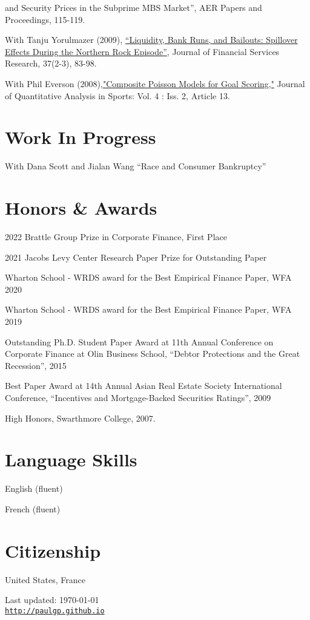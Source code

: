 \documentclass[letterpaper]{article}
\renewenvironment{itemize}{
  \begin{list}{}
    { \setlength{\itemsep}{5pt}
      \setlength{\parsep}{0pt}
      \setlength{\topsep}{0pt}
      \setlength{\leftmargin}{0em} } }{
  \end{list}}
\begin{document}
\begin{itemize}
{    and Security Prices in the Subprime MBS Market''}, AER Papers and Proceedings,  115-119. 
\item With Tanju Yorulmazer (2009), \href{http://www.springerlink.com/content/ww187761jgr660q5/}{``Liquidity, Bank Runs, and Bailouts: Spillover Effects During the Northern Rock Episode''}, Journal of Financial Services Research, 37(2-3), 83-98. 
\item With Phil Everson (2008),\href{http://www.bepress.com/jqas/vol4/iss2/13/}{"Composite Poisson Models for Goal Scoring,"} Journal of Quantitative Analysis in Sports: Vol. 4 : Iss. 2, Article 13.
\end{itemize}


\section*{Work In Progress}
\begin{itemize}
\item With Dana Scott and Jialan Wang ``Race and Consumer Bankruptcy'' 
\end{itemize}

\section*{Honors \& Awards}
\begin{itemize}
\item 2022 Brattle Group Prize in Corporate Finance, First Place
\item 2021 Jacobs Levy Center Research Paper Prize for Outstanding Paper
\item Wharton School - WRDS award for the Best Empirical Finance Paper, WFA 2020
\item Wharton School - WRDS award for the Best Empirical Finance Paper, WFA 2019
\item Outstanding Ph.D. Student Paper Award at 11th Annual Conference
  on Corporate Finance at Olin Business School, ``Debtor Protections
  and the Great Recession'', 2015
\item Best Paper Award at 14th Annual Asian Real Estate Society
  International Conference, ``Incentives and Mortgage-Backed
  Securities Ratings'', 2009
\item High Honors, Swarthmore College, 2007.
\end{itemize}

\section*{Language Skills}
\begin{itemize}
\item English (fluent)
\item French (fluent)
\end{itemize}
\bigskip

\section*{Citizenship}
United States, France
\begin{center}
\begin{footnotesize}
Last updated: \today \\
\href{http://paulgp.github.io}{\tt http://paulgp.github.io}
\end{footnotesize}
\end{center}
\end{document}
